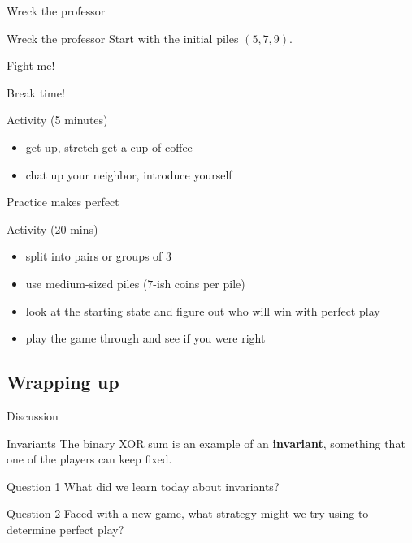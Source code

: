 \documentclass{beamer}
\begin{document}
\begin{frame}{Wreck the professor}
  \begin{block}{Wreck the professor}
    Start with the initial piles $(5,7,9)$.
  \end{block}
  \begin{center}
    Fight me!
  \end{center}
\end{frame}

\begin{frame}{Break time!}
  \begin{block}{Activity (5 minutes)}
    \begin{itemize}
      \item get up, stretch get a cup of coffee
      \item chat up your neighbor, introduce yourself
    \end{itemize}
  \end{block}
\end{frame}

\begin{frame}{Practice makes perfect}
\pause
  \begin{block}{Activity (20 mins)}
    \begin{itemize}
\pause
      \item split into pairs or groups of 3
\pause
      \item use medium-sized piles ($7$-ish coins per pile)
\pause
      \item look at the starting state and figure out who will win with perfect play
\pause
      \item play the game through and see if you were right
    \end{itemize}
  \end{block}
\end{frame}

\subsection{Wrapping up}

\begin{frame}{Discussion}
\pause
  \begin{block}{Invariants}
    The binary XOR sum is an example of an \textbf{invariant}, something that one of the players can keep fixed. 
  \end{block}
\pause
  \begin{block}{Question 1}
    What did we learn today about invariants?
  \end{block}
\pause
  \begin{block}{Question 2}
    Faced with a new game, what strategy might we try using to determine perfect play?
  \end{block}
\end{frame}
\end{document}
